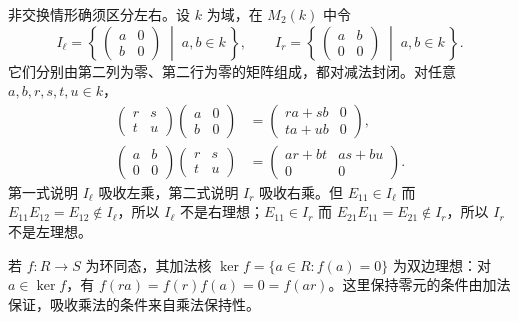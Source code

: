 \ProseParagraphBreak
非交换情形确须区分左右。设 \(k\) 为域，在 \(M_2(k)\) 中令
\[
	I_\ell=\left\{\,\begin{pmatrix}a&0\\b&0\end{pmatrix}
	\;\middle|\;a,b\in k\,\right\},\qquad
	I_r=\left\{\,\begin{pmatrix}a&b\\0&0\end{pmatrix}
	\;\middle|\;a,b\in k\,\right\}.
\]
它们分别由第二列为零、第二行为零的矩阵组成，都对减法封闭。对任意 \(a,b,r,s,t,u\in k\)，
\[
	\begin{aligned}
		\begin{pmatrix}r&s\\t&u\end{pmatrix}
		\begin{pmatrix}a&0\\b&0\end{pmatrix}
		&=\begin{pmatrix}ra+sb&0\\ta+ub&0\end{pmatrix},\\
		\begin{pmatrix}a&b\\0&0\end{pmatrix}
		\begin{pmatrix}r&s\\t&u\end{pmatrix}
		&=\begin{pmatrix}ar+bt&as+bu\\0&0\end{pmatrix}.
	\end{aligned}
\]
第一式说明 \(I_\ell\) 吸收左乘，第二式说明 \(I_r\) 吸收右乘。但 \(E_{11}\in I_\ell\) 而 \(E_{11}E_{12}=E_{12}\notin I_\ell\)，所以 \(I_\ell\) 不是右理想；\(E_{11}\in I_r\) 而 \(E_{21}E_{11}=E_{21}\notin I_r\)，所以 \(I_r\) 不是左理想。

\ProseParagraphBreak
若 \(f:R\rightarrow S\) 为环同态，其加法核 \(\ker f=\{a\in R:f(a)=0\}\) 为双边理想：对 \(a\in\ker f\)，有 \(f(ra)=f(r)f(a)=0=f(ar)\)。这里保持零元的条件由加法保证，吸收乘法的条件来自乘法保持性。

